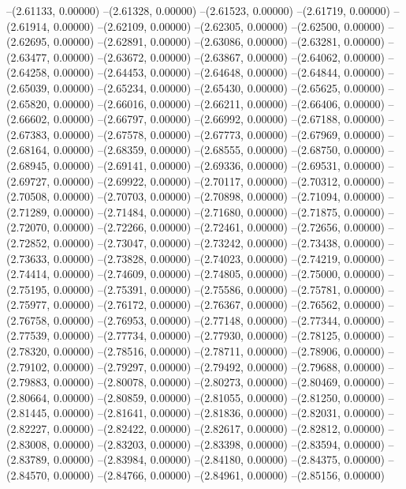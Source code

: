 --(2.61133, 0.00000)
--(2.61328, 0.00000)
--(2.61523, 0.00000)
--(2.61719, 0.00000)
--(2.61914, 0.00000)
--(2.62109, 0.00000)
--(2.62305, 0.00000)
--(2.62500, 0.00000)
--(2.62695, 0.00000)
--(2.62891, 0.00000)
--(2.63086, 0.00000)
--(2.63281, 0.00000)
--(2.63477, 0.00000)
--(2.63672, 0.00000)
--(2.63867, 0.00000)
--(2.64062, 0.00000)
--(2.64258, 0.00000)
--(2.64453, 0.00000)
--(2.64648, 0.00000)
--(2.64844, 0.00000)
--(2.65039, 0.00000)
--(2.65234, 0.00000)
--(2.65430, 0.00000)
--(2.65625, 0.00000)
--(2.65820, 0.00000)
--(2.66016, 0.00000)
--(2.66211, 0.00000)
--(2.66406, 0.00000)
--(2.66602, 0.00000)
--(2.66797, 0.00000)
--(2.66992, 0.00000)
--(2.67188, 0.00000)
--(2.67383, 0.00000)
--(2.67578, 0.00000)
--(2.67773, 0.00000)
--(2.67969, 0.00000)
--(2.68164, 0.00000)
--(2.68359, 0.00000)
--(2.68555, 0.00000)
--(2.68750, 0.00000)
--(2.68945, 0.00000)
--(2.69141, 0.00000)
--(2.69336, 0.00000)
--(2.69531, 0.00000)
--(2.69727, 0.00000)
--(2.69922, 0.00000)
--(2.70117, 0.00000)
--(2.70312, 0.00000)
--(2.70508, 0.00000)
--(2.70703, 0.00000)
--(2.70898, 0.00000)
--(2.71094, 0.00000)
--(2.71289, 0.00000)
--(2.71484, 0.00000)
--(2.71680, 0.00000)
--(2.71875, 0.00000)
--(2.72070, 0.00000)
--(2.72266, 0.00000)
--(2.72461, 0.00000)
--(2.72656, 0.00000)
--(2.72852, 0.00000)
--(2.73047, 0.00000)
--(2.73242, 0.00000)
--(2.73438, 0.00000)
--(2.73633, 0.00000)
--(2.73828, 0.00000)
--(2.74023, 0.00000)
--(2.74219, 0.00000)
--(2.74414, 0.00000)
--(2.74609, 0.00000)
--(2.74805, 0.00000)
--(2.75000, 0.00000)
--(2.75195, 0.00000)
--(2.75391, 0.00000)
--(2.75586, 0.00000)
--(2.75781, 0.00000)
--(2.75977, 0.00000)
--(2.76172, 0.00000)
--(2.76367, 0.00000)
--(2.76562, 0.00000)
--(2.76758, 0.00000)
--(2.76953, 0.00000)
--(2.77148, 0.00000)
--(2.77344, 0.00000)
--(2.77539, 0.00000)
--(2.77734, 0.00000)
--(2.77930, 0.00000)
--(2.78125, 0.00000)
--(2.78320, 0.00000)
--(2.78516, 0.00000)
--(2.78711, 0.00000)
--(2.78906, 0.00000)
--(2.79102, 0.00000)
--(2.79297, 0.00000)
--(2.79492, 0.00000)
--(2.79688, 0.00000)
--(2.79883, 0.00000)
--(2.80078, 0.00000)
--(2.80273, 0.00000)
--(2.80469, 0.00000)
--(2.80664, 0.00000)
--(2.80859, 0.00000)
--(2.81055, 0.00000)
--(2.81250, 0.00000)
--(2.81445, 0.00000)
--(2.81641, 0.00000)
--(2.81836, 0.00000)
--(2.82031, 0.00000)
--(2.82227, 0.00000)
--(2.82422, 0.00000)
--(2.82617, 0.00000)
--(2.82812, 0.00000)
--(2.83008, 0.00000)
--(2.83203, 0.00000)
--(2.83398, 0.00000)
--(2.83594, 0.00000)
--(2.83789, 0.00000)
--(2.83984, 0.00000)
--(2.84180, 0.00000)
--(2.84375, 0.00000)
--(2.84570, 0.00000)
--(2.84766, 0.00000)
--(2.84961, 0.00000)
--(2.85156, 0.00000)
